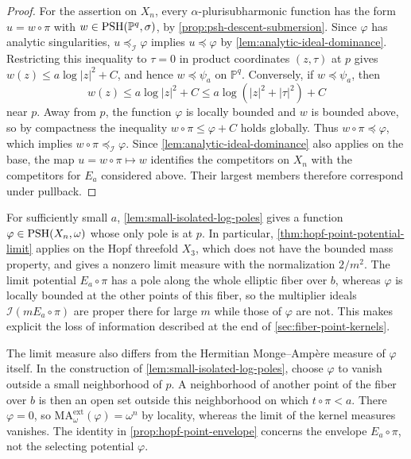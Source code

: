 \begin{proof}
For the assertion on $X_n$, every $\alpha$-plurisubharmonic function has the form $u=w\circ\pi$ with $w\in\mathrm{PSH}(\mathbb P^q,\sigma)$, by \cref{prop:psh-descent-submersion}. Since $\varphi$ has analytic singularities, $u\preceq_{\mathcal I}\varphi$ implies $u\preceq\varphi$ by \cref{lem:analytic-ideal-dominance}. Restricting this inequality to $\tau=0$ in product coordinates $(z,\tau)$ at $p$ gives $w(z)\leq a\log|z|^2+C$, and hence $w\preceq\psi_a$ on $\mathbb P^q$. Conversely, if $w\preceq\psi_a$, then
\[
 w(z)\leq a\log|z|^2+C
             \leq a\log(|z|^2+|\tau|^2)+C
\]
near $p$. Away from $p$, the function $\varphi$ is locally bounded and $w$ is bounded above, so by compactness the inequality $w\circ\pi\leq\varphi+C$ holds globally. Thus $w\circ\pi\preceq\varphi$, which implies $w\circ\pi\preceq_{\mathcal I}\varphi$. Since \cref{lem:analytic-ideal-dominance} also applies on the base, the map $u=w\circ\pi\mapsto w$ identifies the competitors on $X_n$ with the competitors for $E_a$ considered above. Their largest members therefore correspond under pullback.
\end{proof}

For sufficiently small $a$, \cref{lem:small-isolated-log-poles} gives a function $\varphi\in\mathrm{PSH}(X_n,\omega)$ whose only pole is at $p$. In particular, \cref{thm:hopf-point-potential-limit} applies on the Hopf threefold $X_3$, which does not have the bounded mass property, and gives a nonzero limit measure with the normalization $2/m^2$. The limit potential $E_a\circ\pi$ has a pole along the whole elliptic fiber over $b$, whereas $\varphi$ is locally bounded at the other points of this fiber, so the multiplier ideals $\mathcal I(mE_a\circ\pi)$ are proper there for large $m$ while those of $\varphi$ are not. This makes explicit the loss of information described at the end of \cref{sec:fiber-point-kernels}.

\enlargethispage{2\baselineskip}
The limit measure also differs from the Hermitian Monge--Amp\`ere measure of $\varphi$ itself. In the construction of \cref{lem:small-isolated-log-poles}, choose $\varphi$ to vanish outside a small neighborhood of $p$. A neighborhood of another point of the fiber over $b$ is then an open set outside this neighborhood on which $t\circ\pi<a$. There $\varphi=0$, so $\mathrm{MA}^{\mathrm{ext}}_\omega(\varphi)=\omega^n$ by locality, whereas the limit of the kernel measures vanishes. The identity in \cref{prop:hopf-point-envelope} concerns the envelope $E_a\circ\pi$, not the selecting potential $\varphi$.
